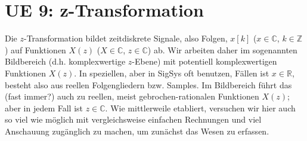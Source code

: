 \clearpage
\section{UE 9: z-Transformation}
%
Die $z$-Transformation bildet zeitdiskrete Signale, also Folgen, $x[k]$
($x\in\mathbb{C}$, $k\in\mathbb{Z}$)
auf Funktionen $X(z)$ ($X\in\mathbb{C}$, $z\in\mathbb{C}$)
ab.
%
Wir arbeiten daher im sogenannten Bildbereich (d.h. komplexwertige $z$-Ebene) mit
potentiell komplexwertigen Funktionen $X(z)$.
%
In speziellen, aber in SigSys oft benutzen, Fällen ist $x\in\mathbb{R}$, besteht
also aus reellen Folgengliedern bzw. Samples. Im Bildbereich führt das (fast immer?)
auch zu reellen, meist gebrochen-rationalen Funktionen $X(z)$;
aber in jedem Fall ist $z\in\mathbb{C}$.
%
Wie mittlerweile etabliert, versuchen wir hier auch so viel wie möglich mit
vergleichsweise einfachen Rechnungen und viel Anschauung zugänglich zu machen,
um zunächst das Wesen zu erfassen.
%


